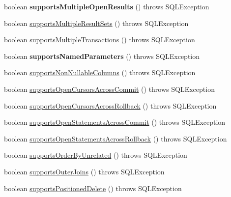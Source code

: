 \begin{DoxyCompactItemize}
boolean {\bfseries supports\+Multiple\+Open\+Results} ()  throws S\+Q\+L\+Exception 
\item 
boolean \mbox{\hyperlink{classcom_1_1mysql_1_1cj_1_1jdbc_1_1_database_meta_data_ac2598c637493e0cc7ca5f5cb1c1c464f}{supports\+Multiple\+Result\+Sets}} ()  throws S\+Q\+L\+Exception 
\item 
boolean \mbox{\hyperlink{classcom_1_1mysql_1_1cj_1_1jdbc_1_1_database_meta_data_a18865768002c7d7527f714e7ebf39f27}{supports\+Multiple\+Transactions}} ()  throws S\+Q\+L\+Exception 
\item 
\mbox{\label{classcom_1_1mysql_1_1cj_1_1jdbc_1_1_database_meta_data_a277857cdcf18defc8af079da8368b0b2}} 
boolean {\bfseries supports\+Named\+Parameters} ()  throws S\+Q\+L\+Exception 
\item 
boolean \mbox{\hyperlink{classcom_1_1mysql_1_1cj_1_1jdbc_1_1_database_meta_data_ac93acbd1e24b19de7e90e19cf61218a6}{supports\+Non\+Nullable\+Columns}} ()  throws S\+Q\+L\+Exception 
\item 
boolean \mbox{\hyperlink{classcom_1_1mysql_1_1cj_1_1jdbc_1_1_database_meta_data_a3b76cdd70d934791899e12a59e365a10}{supports\+Open\+Cursors\+Across\+Commit}} ()  throws S\+Q\+L\+Exception 
\item 
boolean \mbox{\hyperlink{classcom_1_1mysql_1_1cj_1_1jdbc_1_1_database_meta_data_af3a996ba4e3b048d32c31eb7c3b78d72}{supports\+Open\+Cursors\+Across\+Rollback}} ()  throws S\+Q\+L\+Exception 
\item 
boolean \mbox{\hyperlink{classcom_1_1mysql_1_1cj_1_1jdbc_1_1_database_meta_data_a1171f342070ba74e050ada26fb00a2e5}{supports\+Open\+Statements\+Across\+Commit}} ()  throws S\+Q\+L\+Exception 
\item 
boolean \mbox{\hyperlink{classcom_1_1mysql_1_1cj_1_1jdbc_1_1_database_meta_data_a73a0af0c988f3bf90b1ab8a57b64eda1}{supports\+Open\+Statements\+Across\+Rollback}} ()  throws S\+Q\+L\+Exception 
\item 
boolean \mbox{\hyperlink{classcom_1_1mysql_1_1cj_1_1jdbc_1_1_database_meta_data_a93f3c1c92f35d93a3a016d19b7ae19ef}{supports\+Order\+By\+Unrelated}} ()  throws S\+Q\+L\+Exception 
\item 
boolean \mbox{\hyperlink{classcom_1_1mysql_1_1cj_1_1jdbc_1_1_database_meta_data_a61be48103a75fa639d5a422acbb15b49}{supports\+Outer\+Joins}} ()  throws S\+Q\+L\+Exception 
\item 
boolean \mbox{\hyperlink{classcom_1_1mysql_1_1cj_1_1jdbc_1_1_database_meta_data_aceadcafefa2483ef40e48b1aeb2edd33}{supports\+Positioned\+Delete}} ()  throws S\+Q\+L\+Exception 

\end{DoxyCompactItemize}
